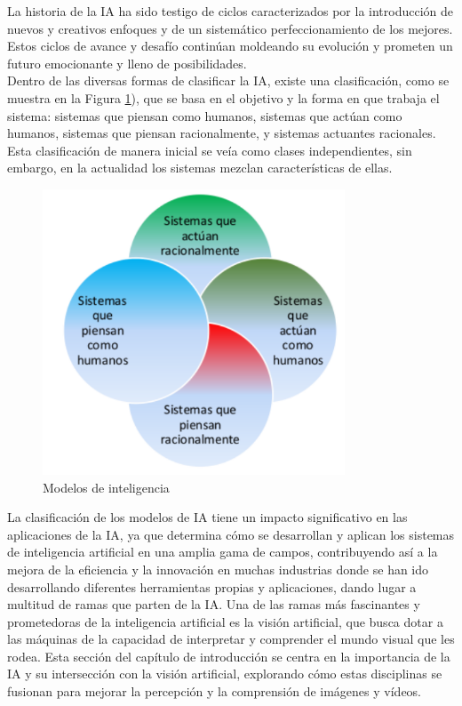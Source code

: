 La historia de la IA ha sido testigo de ciclos caracterizados por la introducción de nuevos y creativos enfoques y de un sistemático perfeccionamiento de los mejores. Estos ciclos de avance y desafío continúan moldeando su evolución y prometen un futuro emocionante y lleno de posibilidades.\\

Dentro de las diversas formas de clasificar la IA, existe una clasificación, como se muestra en la Figura \ref{fig:ModelosInteligencia}), que se basa en el objetivo y la forma en que trabaja el sistema: sistemas que piensan como humanos, sistemas que actúan como humanos, sistemas que piensan racionalmente, y sistemas actuantes racionales. Esta clasificación de manera inicial se veía como clases independientes, sin embargo, en la actualidad los sistemas mezclan características de ellas. \cite{Ponce14} \\

\begin{figure} [h!]
    \begin{center}
      \includegraphics[width=9cm]{figs/Modelos de inteligencia.png}
    \end{center}
    \caption{Modelos de inteligencia}
    \label{fig:ModelosInteligencia}
\end{figure}

La clasificación de los modelos de IA tiene un impacto significativo en las aplicaciones de la IA, ya que determina cómo se desarrollan y aplican los sistemas de inteligencia artificial en una amplia gama de campos, contribuyendo así a la mejora de la eficiencia y la innovación en muchas industrias donde se han ido desarrollando diferentes herramientas propias y aplicaciones, dando lugar a multitud de ramas que parten de la IA. Una de las ramas más fascinantes y prometedoras de la inteligencia artificial es la visión artificial, que busca dotar a las máquinas de la capacidad de interpretar y comprender el mundo visual que les rodea. Esta sección del capítulo de introducción se centra en la importancia de la IA y su intersección con la visión artificial, explorando cómo estas disciplinas se fusionan para mejorar la percepción y la comprensión de imágenes y vídeos.

